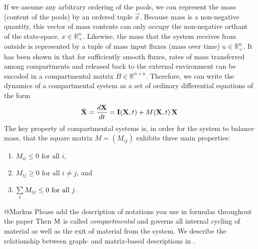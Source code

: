 If we assume any arbitrary ordering of the pools, we can represent the mass (content of the pools)
by an ordered tuple $\vec{x}$.
Because mass is a non-negative quantity, this vector of mass contents can
only occupy the non-negative orthant of the state-space, \ie $x \in
\mathbb{R}^n_+$. 
Likewise, the mass that the system receives from outside is represented
by a tuple of mass input fluxes (mass over time) $u \in \mathbb{R}^n_+$.
It has been shown in \cite{Jacquez1993SIAM}
that for sufficiently smooth fluxes, rates of mass transferred among compartments and released back to the external
environment can be encoded in a compartmental matrix $B \in
\mathbb{R}^{n \times n}$. 
Therefore, we can write the dynamics of a
compartmental system as a set of ordinary differential equations of the form
\begin{equation} \label{eq:CompartmentalSystem}
\dot{\mathbf{X}} = \frac{d\mathbf{X}}{dt} = \mathbf{I}(\mathbf{X}, t) + M(\mathbf{X}, t) \, \mathbf{X}
\end{equation}
The key property of compartmental systems is, in order for the system to balance mass, that the square matrix $M=(M_{ij})$ exhibits three main properties:
\begin{enumerate}
  \item $M_{ii}\leq0\text{ for all }i$,
  \item $M_{ij}\geq0\text{ for all }i\neq j$, and
  \item $\sum\limits_i M_{ij}\leq 0\text{ for all }j$.
\end{enumerate}
{\todo @Markus Please add the description of notations you use in formulas throughout the paper}
Then $\mathrm{M}$ is called \emph{compartmental} and governs all internal cycling of material as well as the exit of material from the system.
We describe the relationship between graph- and matrix-based descriptions in .

